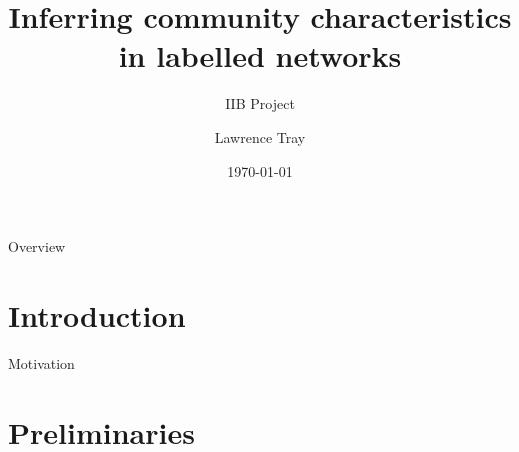 \documentclass{beamer}
\title{Inferring community characteristics in labelled networks}
\subtitle{IIB Project}
\author{Lawrence Tray}
\institute{Ioannis Kontoyiannis}
\date{\today}
\begin{document}
	
	\begin{frame}
		\titlepage
	\end{frame}

	\begin{frame}{Overview}
		\tableofcontents
	\end{frame}

	\section{Introduction}
	
	\begin{frame}{Motivation}

	\end{frame}

	\section{Preliminaries}
	
\end{document}
